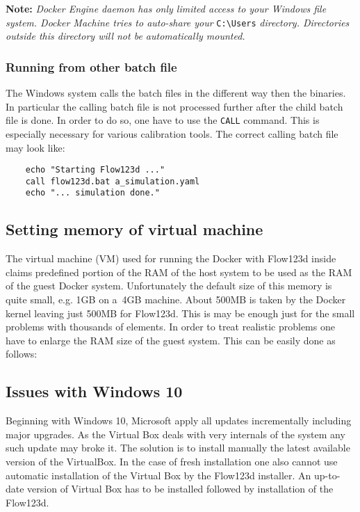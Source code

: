 \textbf{Note:}
\textit{Docker Engine daemon has only limited access to your Windows file system. Docker Machine tries to auto-share your}
\verb'C:\Users' \textit{directory. Directories outside this directory will not be automatically mounted.} 

\subsubsection{Running from other batch file}
The Windows system calls the batch files in the different way then the binaries. In particular the calling batch file is not processed further after the child batch 
file is done. In order to do so, one have to use the \verb'CALL' command. This is especially necessary for various calibration tools. The correct calling batch file 
may look like:
\begin{verbatim}
    echo "Starting Flow123d ..."
    call flow123d.bat a_simulation.yaml 
    echo "... simulation done."
\end{verbatim}


\subsection{Setting memory of virtual machine}
The virtual machine (VM) used for running the Docker with Flow123d inside claims predefined portion of the RAM 
of the host system to be used as the RAM of the guest Docker system. Unfortunately the default size of this memory is
quite small, e.g. 1GB on a~4GB machine. About 500MB is taken by the Docker kernel leaving just 500MB for Flow123d.
This is may be enough just for the small problems with thousands of elements. In order to treat realistic problems one have to 
enlarge the RAM size of the guest system. This can be easily done as follows:

\subsection{Issues with Windows 10}
Beginning with Windows 10, Microsoft apply all updates incrementally including major upgrades. As the Virtual Box deals with very internals of the system
any such update may broke it. The solution is to install manually the latest available version of the VirtualBox. In the case of fresh installation 
one also cannot use automatic installation of the Virtual Box by the Flow123d installer. An up-to-date version of Virtual Box has to be installed followed by 
installation of the Flow123d.

